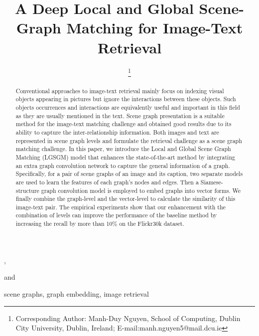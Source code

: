 \documentclass{IOS-Book-Article}
\def\hb{\hbox to 10.7 cm{}}
\begin{document}
\pagestyle{headings}
\def\thepage{}

\begin{frontmatter}              


\title{A Deep Local and Global Scene-Graph Matching for Image-Text Retrieval}

\markboth{}{April 2021\hb}


\author[A]{ \thanks{Corresponding Author: Manh-Duy Nguyen, School of Computing, Dublin City University, Dublin, Ireland; E-mail:manh.nguyen5@mail.dcu.ie}},
\author[B,C,D]{ }
and
\author[A]{ }

\address[A]{School of Computing, Dublin, Ireland}
\address[B]{AISIA Research Lab}
\address[C]{University of Science, Ho Chi Minh City, Vietnam}
\address[D]{Vietnam National University Ho Chi Minh City, Vietnam}





\begin{abstract}
Conventional approaches to image-text retrieval mainly focus on indexing visual objects appearing in pictures but ignore the interactions between these objects. Such objects occurrences and interactions are equivalently useful and important in this field as they are usually mentioned in the text. Scene graph presentation is a suitable method for the image-text matching challenge and obtained good results due to its ability to capture the inter-relationship information. Both images and text are represented in scene graph levels and formulate the retrieval challenge as a scene graph matching challenge. In this paper, we introduce the Local and Global Scene Graph Matching (LGSGM) model that enhances the state-of-the-art method by integrating an extra graph convolution network to capture the general information of a graph. Specifically, for a pair of scene graphs of an image and its caption, two separate models are used to learn the features of each graph's nodes and edges. Then a Siamese-structure graph convolution model is employed to embed graphs into vector forms. We finally combine the graph-level and the vector-level to calculate the similarity of this image-text pair. The empirical experiments show that our enhancement with the combination of levels can improve the performance of the baseline method by increasing the recall by more than 10$\%$ on the Flickr30k dataset.
\end{abstract}

\begin{keyword}
scene graphs, graph embedding, image retrieval
\end{keyword}
\end{frontmatter}
\end{document}
